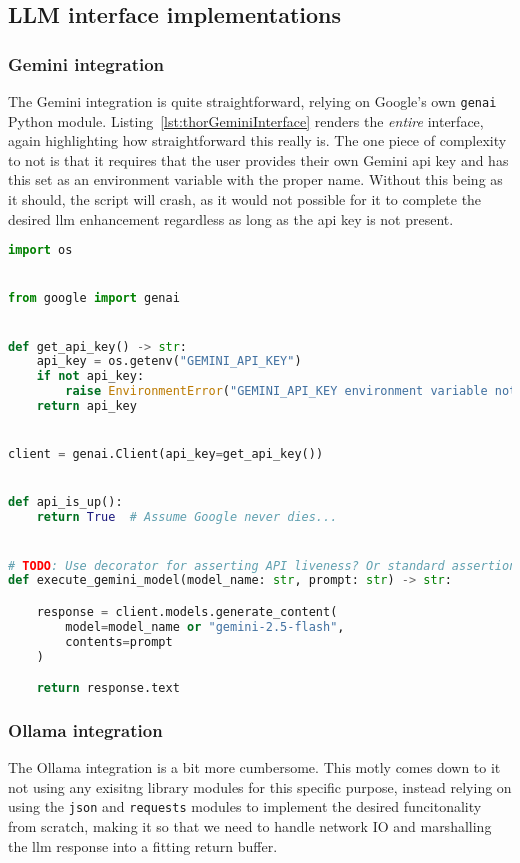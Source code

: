 \subsection{LLM interface implementations}
\subsubsection{Gemini integration}

The Gemini integration is quite straightforward, relying on Google's own
\texttt{genai} Python module. Listing~\ref{lst:thorGeminiInterface} renders the
\emph{entire} interface, again highlighting how straightforward this really is.
The one piece of complexity to not is that it requires that the user provides
their own Gemini \acrshort{api} key and has this set as an environment variable
with the proper name. Without this being as it should, the script will crash, as
it would not possible for it to complete the desired \acrshort{llm} enhancement
regardless as long as the \acrshort{api} key is not present.

\begin{lstlisting}[caption={llm\_api\_interfaces/gemini\_interface.py, The implementation of a Gemini interface for executing prompts.}, label={lst:thorGeminiInterface}, language={Python}]
import os


from google import genai


def get_api_key() -> str:
    api_key = os.getenv("GEMINI_API_KEY")
    if not api_key:
        raise EnvironmentError("GEMINI_API_KEY environment variable not set.")
    return api_key


client = genai.Client(api_key=get_api_key())


def api_is_up():
    return True  # Assume Google never dies...


# TODO: Use decorator for asserting API liveness? Or standard assertion??
def execute_gemini_model(model_name: str, prompt: str) -> str:

    response = client.models.generate_content(
        model=model_name or "gemini-2.5-flash",
        contents=prompt
    )

    return response.text
\end{lstlisting}

\subsubsection{Ollama integration}

The Ollama integration is a bit more cumbersome. This motly comes down to it not
using any exisitng library modules for this specific purpose, instead relying on
using the \texttt{json} and \texttt{requests} modules to implement the desired
funcitonality from scratch, making it so that we need to handle network IO and
marshalling the \acrfull{llm} response into a fitting return buffer.

